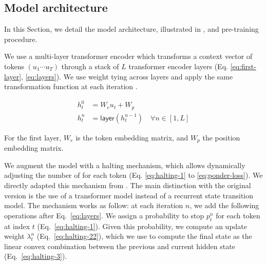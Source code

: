 
\subsection{Model architecture}

In this Section, we detail the model architecture, illustrated in , and pre-training procedure.

We use a multi-layer transformer encoder \parencite{devlin_19} which transforms a context vector of tokens $(u_1 \cdots u_{T})$ through a stack of $L$ transformer encoder layers (Eq. \ref{eq:first-layer}, \ref{eq:layers}). 
We use weight tying across layers and apply the same transformation function at each iteration \parencite{lan_20}.

\begin{align}
    h^0_t &= W_eu_t + W_p \label{eq:first-layer}\\
    h^n_t &= \mathsf{layer}(h^{n-1}_t) \quad \forall n \in [1, L] \label{eq:layers}
\end{align}

For the first layer, $W_e$ is the token embedding matrix, and $W_p$ the position embedding matrix. 

We augment the model with a halting mechanism, which allows dynamically adjusting the number of  for each token (Eq. \ref{eq:halting-1} to \ref{eq:ponder-loss}). We directly adapted this mechanism from \textcite{graves_16}. The main distinction with the original version is the use of a transformer model instead of a recurrent state transition model. The mechanism works as follow: at each iteration $n$, we add the following operations after Eq.~\ref{eq:layers}. We assign a probability to stop $p^n_t$ for each token at index $t$ (Eq.~\ref{eq:halting-1}). 
Given this probability, we compute an update weight $\lambda^n_t$ (Eq.~\ref{eq:halting-22}), which we use to compute the final state as the linear convex combination between the previous and current hidden state (Eq.~\ref{eq:halting-3}). 


